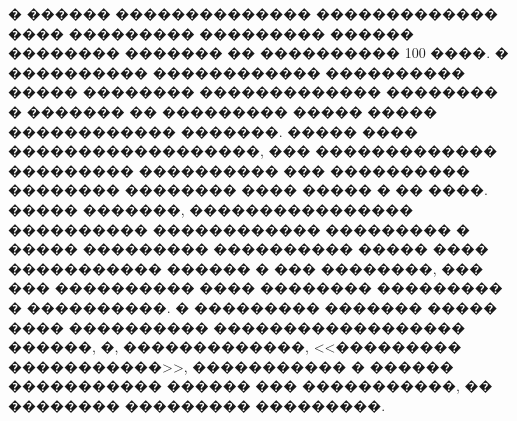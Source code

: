 \documentclass[11pt]{ubs}
\begin{document}
\noindent
� ������ �������������� ������������� ���� ��������� ��������� ������ ��������  ������� �� ���������� 100 ����. 
� ���������� ������������ ���������� ����� �������� ������������� �������� � ������� �� ��������� ����� ����� ������������ �������. 
����� ���� ������������������, ��� ������������� ��������� ���������� ��� ���������� �������� �������� ���� ����� � �� ����. 
����� �������, ���������������� ���������� ������������ ��������� � ����� ��������� ���������� ����� ���� ����������� ������ � ��� ��������, ��� ��� ���������� ���� �������� ��������� � ����������. 
� ��������� ������� ����� ���� ���������� ������������������ ������, �, �������������, <<��������� �����������>>, ����������� � ������ ����������� ������ ��� �����������, �� �������� ��������� ���������.


\newpage
\end{document}
